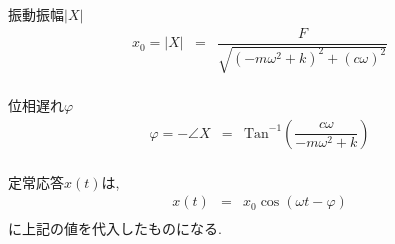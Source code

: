 \documentclass[a4paper]{jsarticle}
\begin{document}
\begin{itembox}[l]{振動振幅$|X|$}
    \begin{eqnarray*}
        x_0=|X|&=&\dfrac{F}{\sqrt{\left(-m\omega^2+k\right)^2+\left(c\omega\right)^2}}\\
    \end{eqnarray*}
\end{itembox}
\begin{itembox}[l]{位相遅れ$\varphi$}
    \begin{eqnarray*}
        \varphi=-\angle X &=&\mathrm{Tan}^{-1}\left(\dfrac{c\omega}{-m\omega^2+k}\right)\\
    \end{eqnarray*}
\end{itembox}
定常応答$x\left(t\right)$は,
\begin{eqnarray*}
    x\left(t\right)&=&x_0\cos\left(\omega t-\varphi\right)\\
\end{eqnarray*}
に上記の値を代入したものになる.\\
\end{document}
